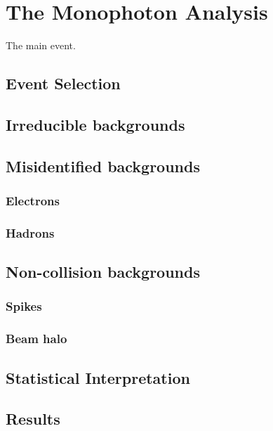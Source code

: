 \chapter{The Monophoton Analysis}

The main event.

\section{Event Selection}

\section{Irreducible backgrounds}

\section{Misidentified backgrounds}

\subsection{Electrons}

\subsection{Hadrons}

\section{Non-collision backgrounds}

\subsection{Spikes}

\subsection{Beam halo}

\section{Statistical Interpretation}

\section{Results}



